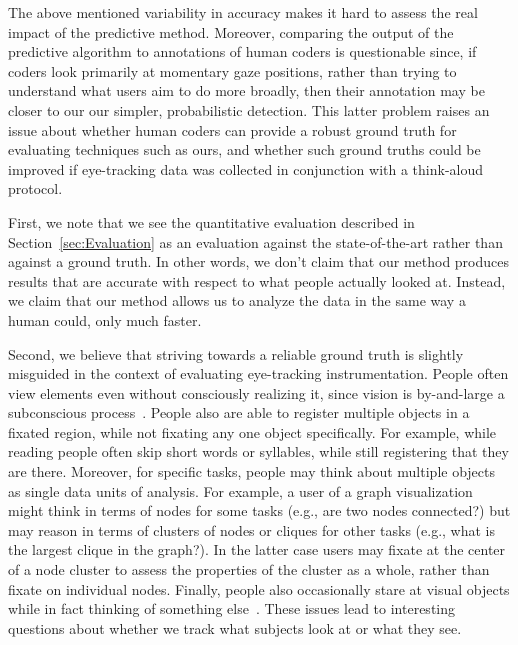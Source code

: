 The above mentioned variability in accuracy makes it hard to assess the real impact of the predictive method. Moreover, comparing the output of the predictive algorithm to annotations of human coders is questionable since, if coders look primarily at momentary gaze positions, rather than trying to understand what users aim to do more broadly, then their annotation may be closer to our our simpler, probabilistic detection.  This latter problem raises an issue about whether human coders can provide a robust ground truth for evaluating techniques such as ours, and whether such ground truths could be improved if eye-tracking data was collected in conjunction with a think-aloud protocol.  

First, we note that we see the quantitative evaluation described in Section~\ref{sec:Evaluation} as an evaluation against the state-of-the-art rather than against a ground truth. In other words, we don't claim that our method produces results that are accurate with respect to what people actually looked at. Instead, we claim that our method allows us to analyze the data in the same way a human could, only much faster. 

Second, we believe that striving towards a reliable ground truth is slightly misguided in the context of evaluating eye-tracking instrumentation.  People often view elements even without consciously realizing it, since vision is by-and-large a subconscious process~\cite{duchowski2007eye}. People also are able to register multiple objects in a fixated region, while not fixating any one object specifically. For example, while reading people often skip short words or syllables, while still registering that they are there. Moreover, for specific tasks, people may think about multiple objects as single data units of analysis. For example, a user of a graph visualization might think in terms of nodes for some tasks (e.g., are two nodes connected?) but may reason in terms of clusters of nodes or cliques for other tasks (e.g., what is the largest clique in the graph?). In the latter case users may fixate at the center of a node cluster to assess the properties of the cluster as a whole, rather than fixate on individual nodes. Finally, people also occasionally stare at visual objects while in fact thinking of something else~\cite{duchowski2007eye}. These issues lead to interesting questions about whether we track what subjects look at or what they see.  


